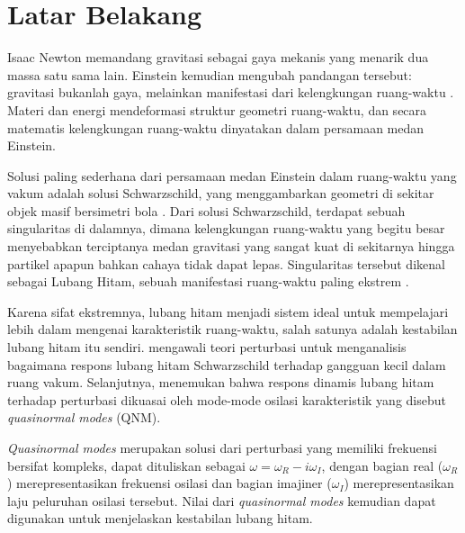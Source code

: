 \section{Latar Belakang}
\label{sec:background}

\noindent Isaac Newton memandang gravitasi sebagai gaya mekanis yang menarik dua massa satu sama lain. Einstein kemudian mengubah pandangan tersebut: gravitasi bukanlah gaya, melainkan manifestasi dari kelengkungan ruang-waktu \parencite{Einstein1916}. Materi dan energi mendeformasi struktur geometri ruang-waktu, dan secara matematis kelengkungan ruang-waktu dinyatakan dalam persamaan medan Einstein.

Solusi paling sederhana dari persamaan medan Einstein dalam ruang-waktu yang vakum adalah solusi Schwarzschild, yang menggambarkan geometri di sekitar objek masif bersimetri bola \parencite{Schwarzschild1916}. Dari solusi Schwarzschild, terdapat sebuah singularitas di dalamnya, dimana kelengkungan ruang-waktu yang begitu besar menyebabkan terciptanya medan gravitasi yang sangat kuat di sekitarnya hingga partikel apapun bahkan cahaya tidak dapat lepas. Singularitas tersebut dikenal sebagai Lubang Hitam, sebuah manifestasi ruang-waktu paling ekstrem \parencite{Frolov1998}.

Karena sifat ekstremnya, lubang hitam menjadi sistem ideal untuk mempelajari lebih dalam mengenai karakteristik ruang-waktu, salah satunya adalah kestabilan lubang hitam itu sendiri. \textcite{Regge1957} mengawali teori perturbasi untuk menganalisis bagaimana respons lubang hitam Schwarzschild terhadap gangguan kecil dalam ruang vakum. Selanjutnya, \textcite{Vishveshwara1970} menemukan bahwa respons dinamis lubang hitam terhadap perturbasi dikuasai oleh mode-mode osilasi karakteristik yang disebut \textit{quasinormal modes} (QNM).

\textit{Quasinormal modes} merupakan solusi dari perturbasi yang memiliki frekuensi bersifat kompleks, dapat dituliskan sebagai $\omega = \omega_R - i\omega_I$, dengan bagian real ($\omega_R$) merepresentasikan frekuensi osilasi dan bagian imajiner ($\omega_I$) merepresentasikan laju peluruhan osilasi tersebut. Nilai dari \textit{quasinormal modes} kemudian dapat digunakan untuk menjelaskan kestabilan lubang hitam.

